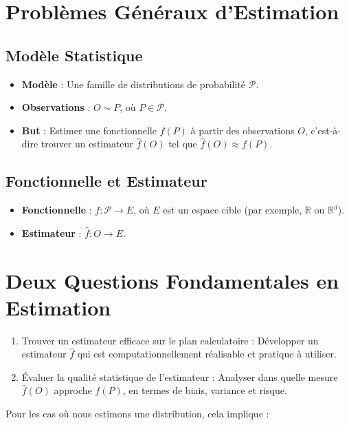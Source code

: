 \documentclass{article}
\begin{document}
\section{Problèmes Généraux d'Estimation}

\subsection{Modèle Statistique}

\begin{itemize}
    \item \textbf{Modèle} : Une famille de distributions de probabilité $\mathcal{P}$.
    \item \textbf{Observations} : $O \sim P$, où $P \in \mathcal{P}$.
    \item \textbf{But} : Estimer une fonctionnelle $f(P)$ à partir des observations $O$, c'est-à-dire trouver un estimateur $\hat{f}(O)$ tel que $\hat{f}(O) \approx f(P)$.
\end{itemize}

\subsection{Fonctionnelle et Estimateur}

\begin{itemize}
    \item \textbf{Fonctionnelle} : $f: \mathcal{P} \rightarrow E$, où $E$ est un espace cible (par exemple, $\mathbb{R}$ ou $\mathbb{R}^d$).
    \item \textbf{Estimateur} : $\hat{f} : O \rightarrow E$.
\end{itemize}

\section{Deux Questions Fondamentales en Estimation}

\begin{enumerate}
    \item Trouver un estimateur efficace sur le plan calculatoire : Développer un estimateur $\hat{f}$ qui est computationnellement réalisable et pratique à utiliser.
    \item Évaluer la qualité statistique de l'estimateur : Analyser dans quelle mesure $\hat{f}(O)$ approche $f(P)$, en termes de biais, variance et risque.
\end{enumerate}

Pour les cas où nous estimons une distribution, cela implique :
\end{document}
